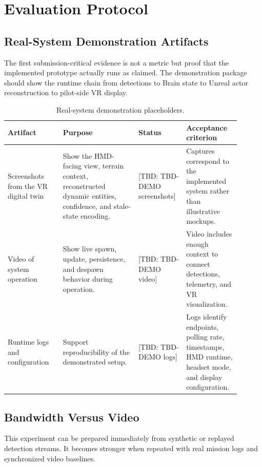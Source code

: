 \documentclass[11pt,a4paper]{article}
\newcommand{\tbd}[1]{\textcolor{publicationred}{[TBD: #1]}}
\begin{document}
\section{Evaluation Protocol}

\subsection{Real-System Demonstration Artifacts}

The first submission-critical evidence is not a metric but proof that the implemented prototype actually runs as claimed. The demonstration package should show the runtime chain from detections to Brain state to Unreal actor reconstruction to pilot-side VR display.

\begin{table}[H]
\centering
\small
\caption{Real-system demonstration placeholders.}
\label{tab:demo-placeholder}
\begin{tabular}{@{}L{0.22\linewidth}L{0.30\linewidth}L{0.18\linewidth}L{0.20\linewidth}@{}}
\toprule
Artifact & Purpose & Status & Acceptance criterion \\
\midrule
Screenshots from the VR digital twin & Show the HMD-facing view, terrain context, reconstructed dynamic entities, confidence, and stale-state encoding. & \tbd{TBD-DEMO screenshots} & Captures correspond to the implemented system rather than illustrative mockups. \\
Video of system operation & Show live spawn, update, persistence, and despawn behavior during operation. & \tbd{TBD-DEMO video} & Video includes enough context to connect detections, telemetry, and VR visualization. \\
Runtime logs and configuration & Support reproducibility of the demonstrated setup. & \tbd{TBD-DEMO logs} & Logs identify endpoints, polling rate, timestamps, HMD runtime, headset mode, and display configuration. \\
\bottomrule
\end{tabular}
\normalsize
\end{table}

\subsection{Bandwidth Versus Video}

This experiment can be prepared immediately from synthetic or replayed detection streams. It becomes stronger when repeated with real mission logs and synchronized video baselines.
\end{document}
